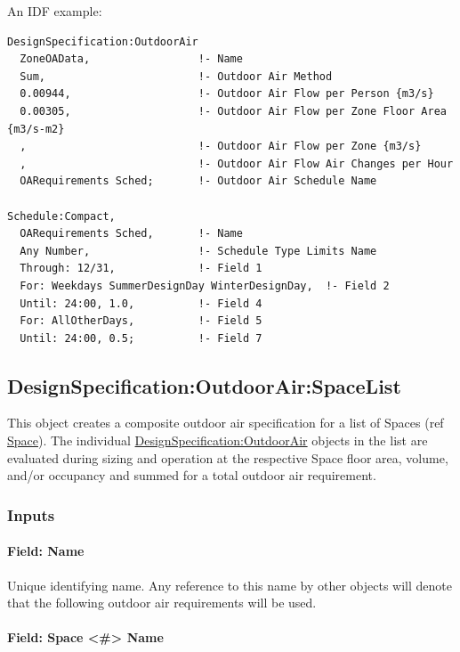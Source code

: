 An IDF example:

\begin{lstlisting}
DesignSpecification:OutdoorAir
  ZoneOAData,                 !- Name
  Sum,                        !- Outdoor Air Method
  0.00944,                    !- Outdoor Air Flow per Person {m3/s}
  0.00305,                    !- Outdoor Air Flow per Zone Floor Area {m3/s-m2}
  ,                           !- Outdoor Air Flow per Zone {m3/s}
  ,                           !- Outdoor Air Flow Air Changes per Hour
  OARequirements Sched;       !- Outdoor Air Schedule Name

Schedule:Compact,
  OARequirements Sched,       !- Name
  Any Number,                 !- Schedule Type Limits Name
  Through: 12/31,             !- Field 1
  For: Weekdays SummerDesignDay WinterDesignDay,  !- Field 2
  Until: 24:00, 1.0,          !- Field 4
  For: AllOtherDays,          !- Field 5
  Until: 24:00, 0.5;          !- Field 7
\end{lstlisting}

\subsection{DesignSpecification:OutdoorAir:SpaceList}\label{designspecificationoutdoorairspacelist}

This object creates a composite outdoor air specification for a list of Spaces (ref \hyperref[space]{Space}). The individual \hyperref[designspecificationoutdoorair]{DesignSpecification:OutdoorAir} objects in the list are evaluated during sizing and operation at the respective Space floor area, volume, and/or occupancy and summed for a total outdoor air requirement.

\subsubsection{Inputs}\label{inputs-dsoaspacelist}

\paragraph{Field: Name}\label{field-dsoaspacelist-name}

Unique identifying name. Any reference to this name by other objects will denote that the following outdoor air requirements will be used.

\paragraph{Field: Space \textless{}\#\textgreater{} Name}\label{field-dsoaspacelist-space-name}

